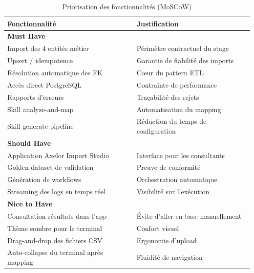 \begin{table}[H]
  \centering
  \renewcommand{\arraystretch}{1.4}
  \begin{tabular}{p{5.5cm} p{7.5cm}}
    \toprule
    \rowcolor{gray!20}
    \textbf{Fonctionnalité} & \textbf{Justification} \\
    \midrule
    \multicolumn{2}{l}{\cellcolor{gray!10}\textbf{Must Have}} \\
    \midrule
    Import des 4 entités métier & Périmètre contractuel du stage \\
    \rowcolor{gray!5}
    Upsert / idempotence & Garantie de fiabilité des imports \\
    Résolution automatique des FK & Cœur du pattern ETL \\
    \rowcolor{gray!5}
    Accès direct PostgreSQL & Contrainte de performance \\
    Rapports d'erreurs & Traçabilité des rejets \\
    \rowcolor{gray!5}
    Skill analyze-and-map & Automatisation du mapping \\
    Skill generate-pipeline & Réduction du temps de configuration \\
    \midrule
    \multicolumn{2}{l}{\cellcolor{gray!10}\textbf{Should Have}} \\
    \midrule
    Application Axelor Import Studio & Interface pour les consultants \\
    \rowcolor{gray!5}
    Golden dataset de validation & Preuve de conformité \\
    Génération de workflows & Orchestration automatique \\
    \rowcolor{gray!5}
    Streaming des logs en temps réel & Visibilité sur l'exécution \\
    \midrule
    \multicolumn{2}{l}{\cellcolor{gray!10}\textbf{Nice to Have}} \\
    \midrule
    Consultation résultats dans l'app & Évite d'aller en base manuellement \\
    \rowcolor{gray!5}
    Thème sombre pour le terminal & Confort visuel \\
    Drag-and-drop des fichiers CSV & Ergonomie d'upload \\
    \rowcolor{gray!5}
    Auto-collapse du terminal après mapping & Fluidité de navigation \\
    \bottomrule
  \end{tabular}
  \caption{Priorisation des fonctionnalités (MoSCoW)}
  \label{tab:priorisation}
\end{table}

